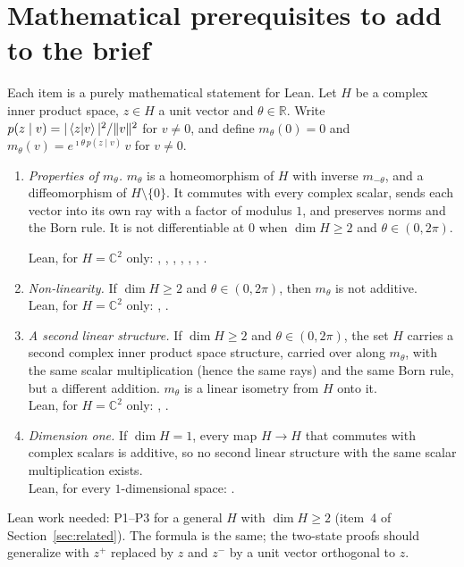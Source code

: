 \documentclass[11pt]{article}
\begin{document}
\section{Mathematical prerequisites to add to the brief}
Each item is a purely mathematical statement for Lean. Let $H$ be a complex inner product space,
$z \in H$ a unit vector and $\theta \in \mathbb R$. Write
$p(z\mid v) = |\braket{z|v}|^2/\|v\|^2$ for $v \ne 0$, and define $m_\theta(0) = 0$ and
$m_\theta(v) = e^{\imath\theta\,p(z\mid v)}\,v$ for $v \neq 0$.
\begin{enumerate}
\item[P1.] \emph{Properties of $m_\theta$.} $m_\theta$ is a homeomorphism of $H$ with inverse
  $m_{-\theta}$, and a diffeomorphism of $H\setminus\{0\}$. It commutes with every complex
  scalar, sends each vector into its own ray with a factor of modulus $1$, and preserves norms
  and the Born rule. It is not differentiable at $0$ when $\dim H \ge 2$ and
  $\theta \in (0,2\pi)$.\par{\raggedright
  Lean, for $H = \mathbb C^2$ only: , ,
  , , , ,
  .\par}
\item[P2.] \emph{Non-linearity.} If $\dim H \ge 2$ and $\theta \in (0, 2\pi)$, then $m_\theta$
  is not additive.\\
  Lean, for $H = \mathbb C^2$ only: , .
\item[P3.] \emph{A second linear structure.} If $\dim H \ge 2$ and $\theta \in (0, 2\pi)$, the
  set $H$ carries a second complex inner product space structure, carried over along
  $m_\theta$, with the same scalar multiplication (hence the same rays) and the same Born rule,
  but a different addition. $m_\theta$ is a linear isometry from $H$ onto it.\\
  Lean, for $H = \mathbb C^2$ only: ,
  .
\item[P4.] \emph{Dimension one.} If $\dim H = 1$, every map $H \to H$ that commutes with complex
  scalars is additive, so no second linear structure with the same scalar multiplication
  exists.\\
  Lean, for every $1$-dimensional space: .
\end{enumerate}
Lean work needed: P1--P3 for a general $H$ with $\dim H \ge 2$ (item~4 of
Section~\ref{sec:related}). The formula is the same; the two-state proofs should generalize
with $z^+$ replaced by $z$ and $z^-$ by a unit vector orthogonal to $z$.
\end{document}

